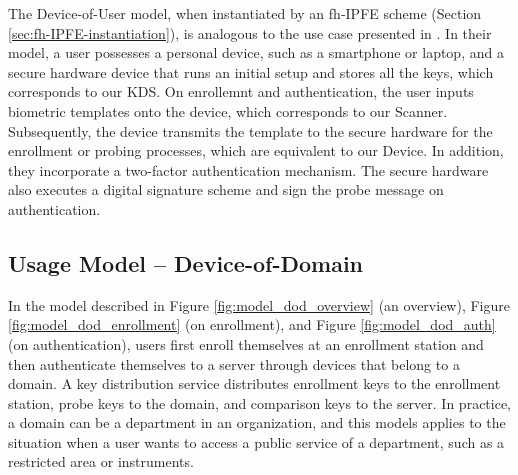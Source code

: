 The Device-of-User model, when instantiated by an fh-IPFE scheme (Section \ref{sec:fh-IPFE-instantiation}), is analogous to the use case presented in \cite{cryptoeprint:2023/481}.
In their model, a user possesses a personal device, such as a smartphone or laptop, and a secure hardware device that runs an initial setup and stores all the keys, which corresponds to our \textsf{KDS}.
On enrollemnt and authentication, the user inputs biometric templates onto the device, which corresponds to our \textsf{Scanner}.
Subsequently, the device transmits the template to the secure hardware for the enrollment or probing processes, which are equivalent to our \textsf{Device}.
In addition, they incorporate a two-factor authentication mechanism.
The secure hardware also executes a digital signature scheme and sign the probe message on authentication.





\subsection{Usage Model – Device-of-Domain}
\label{sec:dod_model}

In the model described in Figure \ref{fig:model_dod_overview} (an overview), Figure \ref{fig:model_dod_enrollment} (on enrollment), and Figure \ref{fig:model_dod_auth} (on authentication), users first enroll themselves at an enrollment station and then authenticate themselves to a server through devices that belong to a domain.
A key distribution service distributes enrollment keys to the enrollment station, probe keys to the domain, and comparison keys to the server. In practice, a domain can be a department in an organization, and this models applies to the situation when a user wants to access a public service of a department, such as a restricted area or instruments. 

